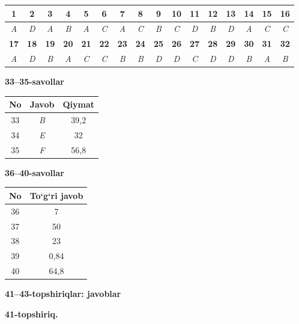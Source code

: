 \documentclass[11pt,a4paper]{article}
\begin{document}
\noindent\begin{tabular}{|c|c|c|c|c|c|c|c|c|c|c|c|c|c|c|c|}\hline
\textbf{1} & \textbf{2} & \textbf{3} & \textbf{4} & \textbf{5} & \textbf{6} & \textbf{7} & \textbf{8} & \textbf{9} & \textbf{10} & \textbf{11} & \textbf{12} & \textbf{13} & \textbf{14} & \textbf{15} & \textbf{16}\\\hline
\textsl{A} & \textsl{D} & \textsl{A} & \textsl{B} & \textsl{A} & \textsl{C} & \textsl{A} & \textsl{C} & \textsl{B} & \textsl{C} & \textsl{D} & \textsl{B} & \textsl{D} & \textsl{A} & \textsl{C} & \textsl{C}\\\hline
\textbf{17} & \textbf{18} & \textbf{19} & \textbf{20} & \textbf{21} & \textbf{22} & \textbf{23} & \textbf{24} & \textbf{25} & \textbf{26} & \textbf{27} & \textbf{28} & \textbf{29} & \textbf{30} & \textbf{31} & \textbf{32}\\\hline
\textsl{A} & \textsl{D} & \textsl{B} & \textsl{A} & \textsl{C} & \textsl{C} & \textsl{B} & \textsl{B} & \textsl{D} & \textsl{D} & \textsl{C} & \textsl{D} & \textsl{D} & \textsl{B} & \textsl{A} & \textsl{B}\\\hline
\end{tabular}\par\medskip
\noindent\textbf{33--35-savollar}\par\smallskip
\noindent\begin{tabular}{|c|c|c|}\hline \textbf{No} & \textbf{Javob} & \textbf{Qiymat}\\\hline
33 & \textsl{B} & 39,2\\\hline
34 & \textsl{E} & 32\\\hline
35 & \textsl{F} & 56,8\\\hline
\end{tabular}\par\medskip
\noindent\textbf{36--40-savollar}\par\smallskip
\noindent\begin{tabular}{|c|c|}\hline \textbf{No} & \textbf{To`g`ri javob}\\\hline
36 & 7\\\hline
37 & 50\\\hline
38 & 23\\\hline
39 & 0,84\\\hline
40 & 64,8\\\hline
\end{tabular}\par\medskip
\noindent\textbf{41--43-topshiriqlar: javoblar}\par\smallskip
\noindent\textbf{41-topshiriq.}\par
\end{document}
